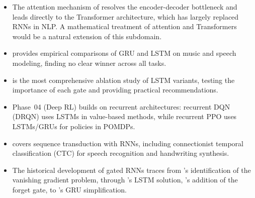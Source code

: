 \documentclass[11pt,a4paper]{article}
\begin{document}
\begin{itemize}
  \item The attention mechanism of \citet{bahdanau2015} resolves
    the encoder-decoder bottleneck and leads directly to the
    Transformer architecture, which has largely replaced RNNs in
    NLP.  A mathematical treatment of attention and Transformers
    would be a natural extension of this subdomain.
  \item \citet{chung2014} provides empirical comparisons of GRU
    and LSTM on music and speech modeling, finding no clear winner
    across all tasks.
  \item \citet{greff2017} is the most comprehensive ablation study
    of LSTM variants, testing the importance of each gate and
    providing practical recommendations.
  \item Phase~04 (Deep RL) builds on recurrent architectures:
    recurrent DQN (DRQN) uses LSTMs in value-based methods, while
    recurrent PPO uses LSTMs/GRUs for policies in POMDPs.
  \item \citet{graves2012} covers sequence transduction with RNNs,
    including connectionist temporal classification (CTC) for
    speech recognition and handwriting synthesis.
  \item The historical development of gated RNNs traces from
    \citet{hochreiter1991}'s identification of the vanishing
    gradient problem, through \citet{hochreiter1997}'s LSTM solution,
    \citet{gers2000}'s addition of the forget gate, to
    \citet{cho2014}'s GRU simplification.
\end{itemize}


\end{document}
